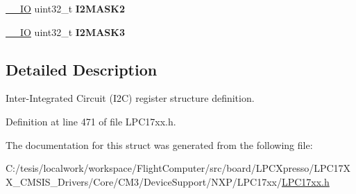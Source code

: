 \begin{DoxyCompactItemize}
\item 
\hypertarget{struct_l_p_c___i2_c___type_def_a9a17d8876473ebcc8378e76762ad7d08}{\hyperlink{group___c_m_s_i_s__core__definitions_gaec43007d9998a0a0e01faede4133d6be}{\-\_\-\-\_\-\-I\-O} uint32\-\_\-t {\bfseries \-I2\-M\-A\-S\-K2}}\label{struct_l_p_c___i2_c___type_def_a9a17d8876473ebcc8378e76762ad7d08}

\item 
\hypertarget{struct_l_p_c___i2_c___type_def_a3e47944a2b1d1d5666ee37fcda81519f}{\hyperlink{group___c_m_s_i_s__core__definitions_gaec43007d9998a0a0e01faede4133d6be}{\-\_\-\-\_\-\-I\-O} uint32\-\_\-t {\bfseries \-I2\-M\-A\-S\-K3}}\label{struct_l_p_c___i2_c___type_def_a3e47944a2b1d1d5666ee37fcda81519f}

\end{DoxyCompactItemize}


\subsection{\-Detailed \-Description}
\-Inter-\/\-Integrated \-Circuit (\-I2\-C) register structure definition. 

\-Definition at line 471 of file \-L\-P\-C17xx.\-h.



\-The documentation for this struct was generated from the following file\-:\begin{DoxyCompactItemize}
\item 
\-C\-:/tesis/localwork/workspace/\-Flight\-Computer/src/board/\-L\-P\-C\-Xpresso/\-L\-P\-C17\-X\-X\-\_\-\-C\-M\-S\-I\-S\-\_\-\-Drivers/\-Core/\-C\-M3/\-Device\-Support/\-N\-X\-P/\-L\-P\-C17xx/\hyperlink{_l_p_c17xx_8h}{\-L\-P\-C17xx.\-h}\end{DoxyCompactItemize}

